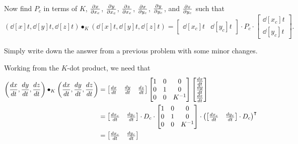 \documentclass{ximera}
\begin{document}
\begin{problem}
  Now find $P_c$ in terms of $K$, $\pp[x]{x_c}$, $\pp[y]{x_c}$,
  $\pp[z]{x_c}$, $\pp[x]{y_c}$, $\pp[y]{y_c}$, and $\pp[z]{y_c}$ such
  that
  \[
  \left(\dd[x]{t}, \dd[y]{t}, \dd[z]{t}\right)\bullet_K
  \left(\dd[x]{t}, \dd[y]{t}, \dd[z]{t}\right)
  =
  \begin{bmatrix}
    \dd[x_c]{t} &  \dd[y_c]{t}
  \end{bmatrix}
  \cdot P_c
  \cdot
  \begin{bmatrix}
    \dd[x_c]{t} \\  \dd[y_c]{t}
  \end{bmatrix}.
  \]
  \begin{hint}
  Simply write down the answer from a previous problem with some minor
  changes.
  \end{hint}
  \begin{freeResponse}
    Working from the $K$-dot product, we need that
    \begin{align*}
    \left(\dd[x]{t}, \dd[y]{t}, \dd[z]{t}\right)\bullet_K
    \left(\dd[x]{t}, \dd[y]{t}, \dd[z]{t}\right)
    &=
    \begin{bmatrix}
      \dd[x]{t} & \dd[y]{t} & \dd[z]{t}
    \end{bmatrix}
    \begin{bmatrix}
      1 & 0 & 0\\
      0 & 1 & 0\\
      0 & 0 & K^{-1}
    \end{bmatrix}
    \begin{bmatrix}
      \dd[x]{t} \\ \dd[y]{t} \\ \dd[z]{t}
    \end{bmatrix}\\
    &=
    \begin{bmatrix}
      \frac{dx_c}{dt} & \frac{dy_c}{dt}
    \end{bmatrix}\cdot D_{c}\cdot
    \begin{bmatrix}
      1 & 0 & 0\\
      0 & 1 & 0\\
    0 & 0 & K^{-1}
    \end{bmatrix}
    \cdot
    \left(
    \begin{bmatrix}
      \frac{dx_c}{dt} & \frac{dy_c}{dt}
    \end{bmatrix}\cdot D_{c}
    \right)^\transpose\\
    &=
    \begin{bmatrix}
      \frac{dx_c}{dt} & \frac{dy_c}{dt}

\end{bmatrix}
\end{align*}
\end{freeResponse}
\end{problem}
\end{document}
